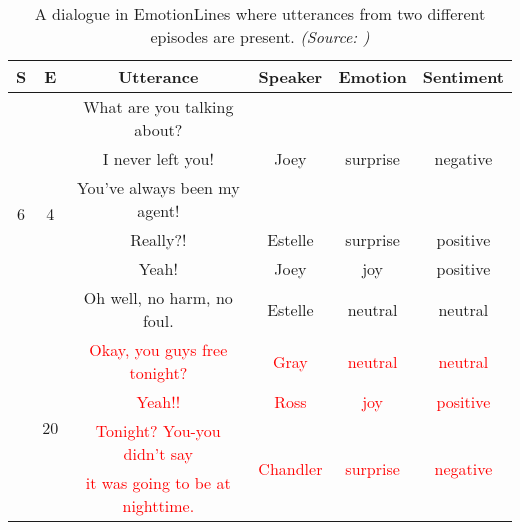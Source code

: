 \begin{table}[h!]
    \centering
    \begin{tabular}{cccccc}
        \toprule
        S & E & Utterance & Speaker & Emotion & Sentiment \\ \midrule
        \multirow{6}{*}{6} & \multirow{6}{*}{4} & What are you talking about? & \multirow{3}{*}{Joey} & \multirow{3}{*}{surprise} & \multirow{3}{*}{negative} \\
        & & I never left you! & & & \\
        & & You've always been my agent! & & & \\
        & & Really?! & Estelle & surprise & positive \\
        & & Yeah! & Joey & joy & positive \\
        & & Oh well, no harm, no foul. & Estelle & neutral & neutral \\ \hdashline
        \multirow{4}{*}{5} & \multirow{4}{*}{20} & \textcolor{red}{Okay, you guys free tonight?} & \textcolor{red}{Gray} & \textcolor{red}{neutral} & \textcolor{red}{neutral} \\
        & & \textcolor{red}{Yeah!!} & \textcolor{red}{Ross} & \textcolor{red}{joy} & \textcolor{red}{positive} \\
        & & \textcolor{red}{Tonight? You-you didn't say} & \multirow{2}{*}{\textcolor{red}{Chandler}} & \multirow{2}{*}{\textcolor{red}{surprise}} & \multirow{2}{*}{\textcolor{red}{negative}} \\
        & & \textcolor{red}{it was going to be at nighttime.} & & & \\ \bottomrule
    \end{tabular}
    \captionsetup{width=0.85\linewidth}
    \caption[EmotionLines utterances from two different episodes]{A dialogue in EmotionLines where utterances from two different episodes are present. \textit{(Source: \cite{meld})}}
    \label{tab:meldvemol}
\end{table}